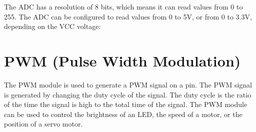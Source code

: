 \documentclass[letterpaper,10pt,english]{sphinxmanual}
\begin{document}
\begin{sphinxVerbatim}[commandchars=\\\{\}]
  
  
  
  
\end{sphinxVerbatim}

\sphinxAtStartPar
The ADC has a resolution of 8 bits, which means it can read values from 0 to 255. The ADC can be configured to read values from 0 to 5V, or from 0 to 3.3V, depending on the VCC voltage:

\begin{sphinxVerbatim}[commandchars=\\\{\}]

 


     
                 
\end{sphinxVerbatim}

\sphinxstepscope


\chapter{PWM (Pulse Width Modulation)}
\label{\detokenize{pwm:pwm-pulse-width-modulation}}\label{\detokenize{pwm::doc}}
\sphinxAtStartPar
The PWM module is used to generate a PWM signal on a pin. The PWM signal is generated by changing the duty cycle of the signal. The duty cycle is the ratio of the time the signal is high to the total time of the signal. The PWM module can be used to control the brightness of an LED, the speed of a motor, or the position of a servo motor.
\end{document}
